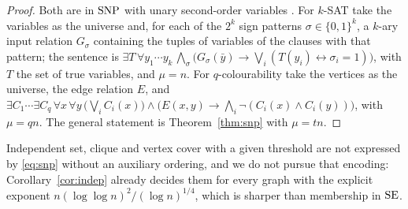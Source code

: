 \begin{proof}
Both are in $\operatorname{SNP}$ with unary second-order variables \cite{PY91,IPZ01}. For
$k$-SAT take the variables as the universe and, for each of the $2^k$ sign
patterns $\sigma\in\{0,1\}^k$, a $k$-ary input relation $G_\sigma$ containing
the tuples of variables of the clauses with that pattern; the sentence is
$\exists T\,\forall y_1\cdots y_k\,\bigwedge_\sigma\bigl(G_\sigma(\bar y)\to
\bigvee_{i}(T(y_i)\leftrightarrow\sigma_i=1)\bigr)$, with $T$ the set of true
variables, and $\mu=n$. For $q$-colourability take the vertices as the universe,
the edge relation $E$, and
$\exists C_1\cdots\exists C_q\,\forall x\,\forall y\,\bigl(\bigvee_i C_i(x)\bigr)
\wedge\bigl(E(x,y)\to\bigwedge_i\neg(C_i(x)\wedge C_i(y))\bigr)$, with $\mu=qn$.
The general statement is Theorem~\ref{thm:snp} with $\mu=tn$.
\end{proof}

Independent set, clique and vertex cover with a given threshold are not
expressed by \eqref{eq:snp} without an auxiliary ordering, and we do not pursue
that encoding: Corollary~\ref{cor:indep} already decides them for every graph
with the explicit exponent $n(\log\log n)^2/(\log n)^{1/4}$, which is sharper
than membership in $\operatorname{SE}$.
